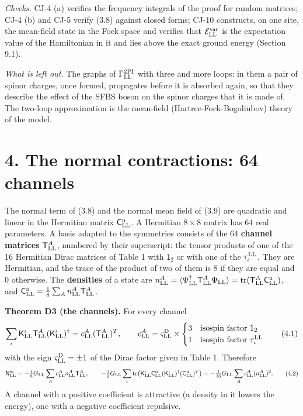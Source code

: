 \documentclass[
  10pt,
]{article}
\begin{document}
\emph{Checks.} CJ-4 (a) verifies the frequency integrals of the proof
for random matrices; CJ-4 (b) and CJ-5 verify (3.8) against closed
forms; CJ-10 constructs, on one site, the mean-field state in the Fock
space and verifies that \(\mathcal E^{\rm var}_{\rm LL}\) is the
expectation value of the Hamiltonian in it and lies above the exact
ground energy (Section 9.1).

\emph{What is left out.} The graphs of \(\Gamma^{\rm 2PI}_{\rm LL}\)
with three and more loops: in them a pair of spinor charges, once
formed, propagates before it is absorbed again, so that they describe
the effect of the SFBS boson on the spinor charges that it is made of.
The two-loop approximation is the mean-field (Hartree-Fock-Bogoliubov)
theory of the model.

\hypertarget{the-normal-contractions-64-channels}{%
\section{4. The normal contractions: 64
channels}\label{the-normal-contractions-64-channels}}

The normal term of (3.8) and the normal mean field of (3.9) are
quadratic and linear in the Hermitian matrix
\(\mathsf C^{\rm n}_{\rm LL}\). A Hermitian \(8\times8\) matrix has 64
real parameters. A basis adapted to the symmetries consists of the 64
\textbf{channel matrices} \(\mathsf T^A_{\rm LL}\), numbered by their
superscript: the tensor products of one of the 16 Hermitian Dirac
matrices of Table 1 with \(\mathsf 1_2\) or with one of the
\(\tau^{\rm LL}_\iota\). They are Hermitian, and the trace of the
product of two of them is 8 if they are equal and 0 otherwise. The
\textbf{densities} of a state are
\(n^A_{\rm LL}=\langle\Psi^\dagger_{\rm LL}\mathsf T^A_{\rm LL}\Psi_{\rm LL}\rangle=\mathrm{tr}(\mathsf T^A_{\rm LL}\mathsf C^{\rm n}_{\rm LL})\),
and
\(\mathsf C^{\rm n}_{\rm LL}=\tfrac18\sum_An^A_{\rm LL}\mathsf T^A_{\rm LL}\).

\textbf{Theorem D3 (the channels).} For every channel
\[\sum_\iota\mathsf K^\iota_{\rm LL}\mathsf T^A_{\rm LL}(\mathsf K^\iota_{\rm LL})^\dagger=c^A_{\rm LL}(\mathsf T^A_{\rm LL})^T,\qquad
c^A_{\rm LL}=\varsigma^{\rm D}_{\rm LL}\times\begin{cases}3&\text{isospin factor }\mathsf 1_2\\1&\text{isospin factor }\tau^{\rm LL}_\iota\end{cases}\tag{4.1}\]
with the sign \(\varsigma^{\rm D}_{\rm LL}=\pm1\) of the Dirac factor
given in Table 1. Therefore
\[\mathsf N^{\rm sc}_{\rm LL}=-\tfrac18G_{\rm LL}\sum_Ac^A_{\rm LL}n^A_{\rm LL}\mathsf T^A_{\rm LL},\qquad
-\tfrac12G_{\rm LL}\sum_\iota\mathrm{tr}\big(\mathsf K^\iota_{\rm LL}\mathsf C^{\rm n}_{\rm LL}(\mathsf K^\iota_{\rm LL})^\dagger(\mathsf C^{\rm n}_{\rm LL})^T\big)=-\tfrac1{16}G_{\rm LL}\sum_Ac^A_{\rm LL}(n^A_{\rm LL})^2.\tag{4.2}\]
A channel with a positive coefficient is attractive (a density in it
lowers the energy), one with a negative coefficient repulsive.
\end{document}

